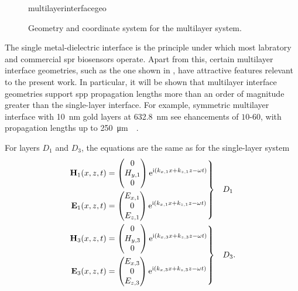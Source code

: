 \begin{figure}[ht]
  \centering
  {multilayerinterfacegeo}
  \caption{Geometry and coordinate system for the multilayer system. }
  \label{fig:multilayergeo}
\end{figure}

The single metal-dielectric interface is the principle under which most
labratory and commercial \gls{spr} biosensors operate.  Apart from this, certain
multilayer interface geometries, such as the one shown in
, have attractive features relevant to the
present work.  In particular, it will be shown that multilayer interface
geometries support \gls{spp} propagation lengths more than an order of magnitude
greater than the single-layer interface.  For example, symmetric multilayer
interface with \SI{10}{\nano\meter} gold layers at \SI{632.8}{\nano\meter}
see ehancements of $10$-$60$, with propagation lengths up to
\SI{250}{\micro\meter}~\cite{kuwamura1983experimental}~\cite{craig1983experimental}.

For layers $D_1$ and $D_3$, the equations are the same as for the single-layer system
\begin{align}
  \left.\begin{aligned}
    \mathbf{H}_1(x,z,t) & =
    \begin{pmatrix}
      0       \\
      H_{y,1} \\
      0
    \end{pmatrix} {\mathrm{e}}^{{\mathrm{i}}(k_{x,1}x+k_{z,1}z-\omega t)} \\
    \mathbf{E}_1(x,z,t) & =
    \begin{pmatrix}
      E_{x,1} \\
      0       \\
      E_{z,1} \\
    \end{pmatrix} {\mathrm{e}}^{{\mathrm{i}}(k_{x,1}x+k_{z,1}z-\omega t)}
  \end{aligned}
  \right\} & \quad D_1\label{eqn:lrsppplanewavedielectric} \\
  \left.\begin{aligned}
    \mathbf{H}_3(x,z,t) & =
    \begin{pmatrix}
      0       \\
      H_{y,3} \\
      0
    \end{pmatrix}
    {\mathrm{e}}^{{\mathrm{i}}(k_{x,3}x+k_{z,3}z-\omega t)} \\
    \mathbf{E}_3(x,z,t) & =
    \begin{pmatrix}
      E_{x,3} \\
      0       \\
      E_{z,3} \\
    \end{pmatrix}
    {\mathrm{e}}^{{\mathrm{i}}(k_{x,3}x+k_{z,3}z-\omega t)}
  \end{aligned}
  \right\} & \quad D_3.
  \label{eqn:lrsppplanewavemetal}
\end{align}

